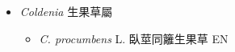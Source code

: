 
  \begin{itemize}
 \item[] \textit{Coldenia} 生果草屬
                                
  \begin{itemize}
        \item[] \textit{C. procumbens} L.  臥莖同籬生果草   EN
  \end{itemize}
  \end{itemize}
